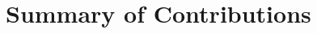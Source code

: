 \documentclass[bachelor]{thesis-uestc}
\begin{document}

\section{Summary of Contributions}
\end{document}
